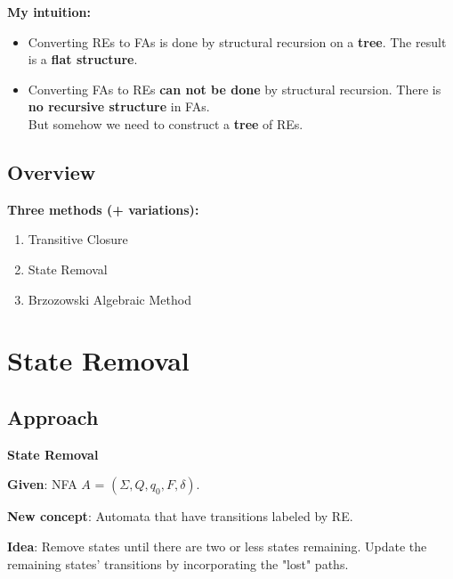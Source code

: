 \documentclass{beamer}
\begin{document}
\begin{frame}
    \textbf{My intuition:} 
    \begin{itemize}
        \item
            Converting REs to FAs is done by structural recursion on a \textbf{tree}. The result is a \textbf{flat structure}.

            \pause

        \item
            Converting FAs to REs \textbf{can not be done} by structural recursion.
            There is \textbf{no recursive structure} in FAs. \\
            But somehow we need to construct a \textbf{tree} of REs.
    \end{itemize}



\end{frame}

\subsection*{Overview}
\begin{frame}

    \textbf{Three methods (+ variations):}

    \begin{enumerate}
        \item Transitive Closure
        \item State Removal
        \item Brzozowski Algebraic Method
    \end{enumerate}

\end{frame}


\section{State Removal}
\subsection*{Approach}
\begin{frame}
    \textbf{State Removal}    

    \textbf{Given}: NFA $A$ = $(\Sigma, Q, q_0, F, \delta)$.

    \textbf{New concept}: Automata that have transitions labeled by RE.

    \textbf{Idea}: Remove states until there are two or less states remaining. Update the remaining states' transitions by incorporating the "lost" paths.


\end{frame}
\end{document}
